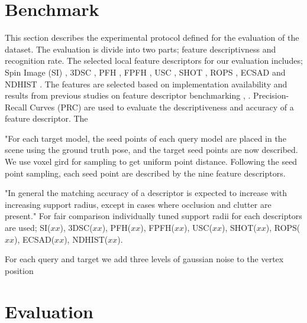\documentclass[10pt,twocolumn,letterpaper]{article}
\begin{document}

\section{Benchmark}\label{sec:benchmark}
This section describes the experimental protocol defined for the evaluation of the dataset. The evaluation is divide into two parts; feature descriptivness and recognition rate. The selected local feature descriptors for our evaluation includes; Spin Image (SI) \cite{Johnson1999}, 3DSC \cite{Frome2004}, PFH \cite{Rusu2008}, FPFH \cite{Fpfh2009}, USC \cite{usc2010}, SHOT \cite{Tombari2010}, ROPS \cite{Guo2013}, ECSAD \cite{Ecsad2015} and NDHIST \cite{Buch2016}. The features are selected based on implementation availability and results from previous studies on feature descriptor benchmarking \cite{Guo2015}, \cite{Buch2016}. Precision-Recall Curves (PRC) are used to evaluate the descriptiveness and accuracy of a feature descriptor. The

"For each target model, the seed points of each query model are placed in the scene using the ground truth pose, and the target seed points are now described. We use voxel gird for sampling \cite{RusuCousins2011} to get uniform point distance. Following the seed point sampling, each seed point are described by the nine feature descriptors. 

"In general the matching accuracy of a descriptor is expected to increase with increasing support radius, except in cases where occlusion and clutter are present." For fair comparison individually tuned support radii for each descriptors are used; SI($xx$), 3DSC($xx$), PFH($xx$), FPFH($xx$), USC($xx$), SHOT($xx$), ROPS($xx$), ECSAD($xx$), NDHIST($xx$).

For each query and target we add three levels of gaussian noise to the vertex position
\section{Evaluation}\label{sec:evaluation}
\end{document}
